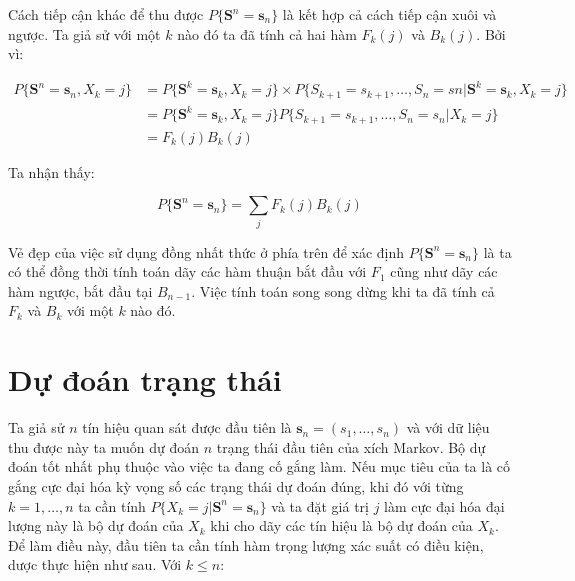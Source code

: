 \documentclass[14pt, a4paper]{article}
\numberwithin{equation}{section}
\numberwithin{figure}{section}
\theoremstyle{sltheorem}
\theoremstyle{soltheorem}
\numberwithin{dl}{section}
\numberwithin{md}{section}
\numberwithin{vd}{section}
\begin{document}
    Cách tiếp cận khác để thu được $P \lbrace \mathbf{S}^n = \mathbf{s}_n \rbrace$ là kết hợp cả cách tiếp cận xuôi và ngược.
    Ta giả sử với một $k$ nào đó ta đã tính cả hai hàm $F_k (j)$ và $B_k (j)$. Bởi vì:

    \begin{equation*}
        \begin{aligned}
            P \lbrace \mathbf{S}^n = \mathbf{s}_n, X_k = j \rbrace &= P \lbrace \mathbf{S}^k = \mathbf{s}_k, X_k = j \rbrace \times P \lbrace S_{k+1} = s_{k+1}, \dots, S_n = sn \vert \mathbf{S}^k = \mathbf{s}_k, X_k = j \rbrace \\
            &= P \lbrace \mathbf{S}^k = \mathbf{s}_k, X_k = j \rbrace P \lbrace S_{k+1} = s_{k+1}, \dots, S_n = s_n \vert X_k = j \rbrace \\
            &= F_k(j) B_k (j)
        \end{aligned}
    \end{equation*}

    Ta nhận thấy:

    \begin{equation*}
        P \lbrace \mathbf{S}^n = \mathbf{s}_n \rbrace = \sum_j F_k(j)B_k(j)
    \end{equation*}

    Vẻ đẹp của việc sử dụng đồng nhất thức ở phía trên để xác định $P \lbrace \mathbf{S}^n = \mathbf{s}_n \rbrace$ là ta có thể đồng thời tính toán dãy các hàm thuận bắt đầu với $F_1$ cũng như dãy các hàm ngược, bắt đầu tại $B_{n-1}$.
    Việc tính toán song song dừng khi ta đã tính cả $F_k$ và $B_k$ với một $k$ nào đó.

    \section{Dự đoán trạng thái}

    Ta giả sử $n$ tín hiệu quan sát được đầu tiên là $\mathbf{s}_n = (s_1, \dots, s_n)$ và với dữ liệu thu được này ta muốn dự đoán $n$ trạng thái đầu tiên của xích Markov.
    Bộ dự đoán tốt nhất phụ thuộc vào việc ta đang cố gắng làm.
    Nếu mục tiêu của ta là cố gắng cực đại hóa kỳ vọng số các trạng thái dự đoán đúng, khi đó với từng $k=1, \dots, n$ ta cần tính $P \lbrace X_k = j \vert \mathbf{S}^n = \mathbf{s}_n \rbrace$ và ta đặt giá trị $j$ làm cực đại hóa đại lượng này là bộ dự đoán của $X_k$ khi cho dãy các tín hiệu là bộ dự đoán của $X_k$.
    Để làm điều này, đầu tiên ta cần tính hàm trọng lượng xác suất có điều kiện, dược thực hiện như sau.
    Với $k \leq n$:
\end{document}
